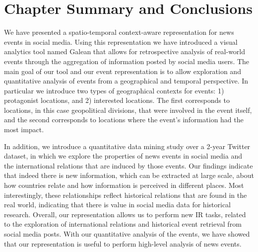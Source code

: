 
\section{Chapter Summary and Conclusions} \label{sec:conclusions}


We have presented a spatio-temporal context-aware representation for news events
in social media. 
%
Using this representation we have introduced a visual analytics tool named
Galean that allows for retrospective analysis of real-world events through the
aggregation of information posted by social media users. 
%
The main goal of our tool and our event representation is to allow exploration
and quantitative analysis of events from a geographical and temporal
perspective. 
%
In particular we introduce two types of geographical contexts for events: 1)
protagonist locations, and 2) interested locations. 
%
The first corresponds to locations, in this case geopolitical divisions, that
were involved in the event itself, and the second corresponds to locations where
the event's information had the most impact.


In addition, we introduce a quantitative data mining study over a 2-year Twitter
dataset, in which we explore the properties of news events in social media and
the international relations that are induced by those events.  
%
Our findings indicate that indeed there is new information, which can be
extracted at large scale, about how countries relate and how information is
perceived in different places. 
%
Most interestingly, these relationships reflect historical relations that are
found in the real world, indicating that there is value in social media data for
historical research.
%
Overall, our representation allows us to perform new IR tasks, related to the
exploration of international relations and historical event retrieval from
social media posts.
%
With our quantitative analysis of the events, we have showed that our representation
is useful to perform high-level analysis of news events.